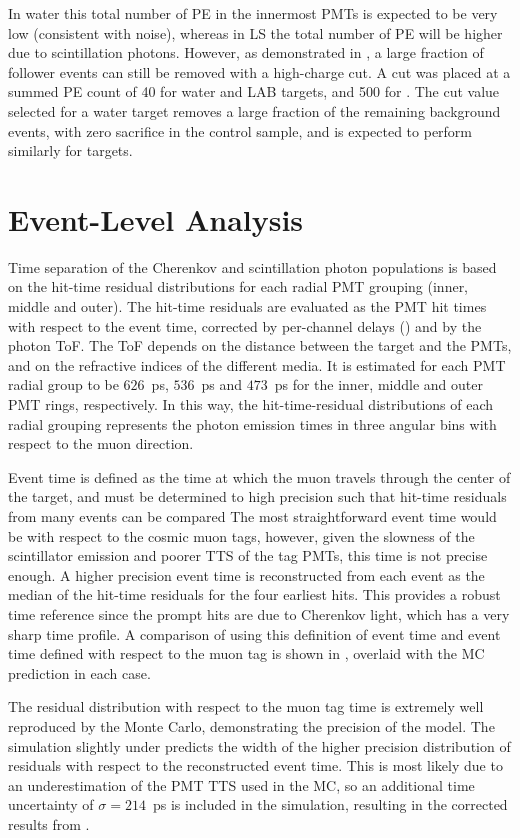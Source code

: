 In water this total number of PE in the innermost PMTs is expected to be very low (consistent with noise), whereas in LS the total number of PE will be higher due to scintillation photons.  
However, as demonstrated in , a large fraction of follower events can still be removed with a high-charge cut.   
A cut was placed at a summed PE count of 40 for water and LAB targets, and 500 for {\labppo}.  
The cut value selected for a water target removes a large fraction of the remaining background events, with zero sacrifice in the control sample, and is expected to perform similarly for {\labppo} targets.

\section{Event-Level Analysis}\label{s:recon}

Time separation of the Cherenkov and scintillation photon populations is based on the hit-time residual distributions for each radial PMT grouping (inner, middle and outer).  
The hit-time residuals are evaluated as the PMT hit times with respect to the event time, corrected by per-channel delays () and by the photon ToF.  
The ToF depends on the distance between the target and the PMTs, and on the refractive indices of the different media. 
It is estimated for each PMT radial group to be $626$~ps, $536$~ps and $473$~ps for the inner, middle and outer PMT rings, respectively.
In this way, the hit-time-residual distributions of each radial grouping represents the photon emission times in three angular bins with respect to the muon direction.

Event time is defined as the time at which the muon travels through the center of the target, and must be determined to high precision such that hit-time residuals from many events can be compared
The most straightforward event time would be with respect to the cosmic muon tags, however, given the slowness of the scintillator emission and poorer TTS of the tag PMTs, this time is not precise enough.
A higher precision event time is reconstructed from each event as the median of the hit-time residuals for the four earliest hits.
This provides a robust time reference since the prompt hits are due to Cherenkov light, which has a very sharp time profile.
A comparison of using this definition of event time and event time defined with respect to the muon tag is shown in , overlaid with the MC prediction in each case.  

The residual distribution with respect to the muon tag time is extremely well reproduced by the Monte Carlo, demonstrating the precision of the model.
The simulation slightly under predicts the width of the higher precision distribution of residuals with respect to the reconstructed event time.  
This is most likely due to an underestimation of the PMT TTS used in the MC, so an additional time uncertainty of $\sigma=214$~ps is included in the simulation, resulting in the corrected results from .

